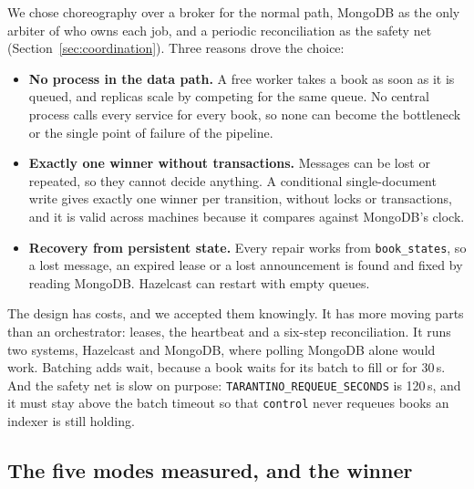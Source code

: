\documentclass[11pt,a4paper]{article}
\newcommand{\code}[1]{\nolinkurl{#1}}
\begin{document}
We chose choreography over a broker for the normal path, MongoDB as the only arbiter of who owns each job, and a
periodic reconciliation as the safety net (Section~\ref{sec:coordination}). Three reasons drove the choice:
\begin{itemize}
\item \textbf{No process in the data path.} A free worker takes a book as soon as it is queued, and replicas scale by
  competing for the same queue. No central process calls every service for every book, so none can become the
  bottleneck or the single point of failure of the pipeline.
\item \textbf{Exactly one winner without transactions.} Messages can be lost or repeated, so they cannot decide
  anything. A conditional single-document write gives exactly one winner per transition, without locks or
  transactions, and it is valid across machines because it compares against MongoDB's clock.
\item \textbf{Recovery from persistent state.} Every repair works from \code{book_states}, so a lost message, an expired
  lease or a lost announcement is found and fixed by reading MongoDB. Hazelcast can restart with empty queues.
\end{itemize}

The design has costs, and we accepted them knowingly. It has more moving parts than an orchestrator: leases, the
heartbeat and a six-step reconciliation. It runs two systems, Hazelcast and MongoDB, where polling MongoDB alone would
work. Batching adds wait, because a book waits for its batch to fill or for 30\,s. And the safety net is slow on
purpose: \code{TARANTINO_REQUEUE_SECONDS} is 120\,s, and it must stay above the batch timeout so that \code{control}
never requeues books an indexer is still holding.

\subsection{The five modes measured, and the winner}
\label{sec:winner}
\end{document}
